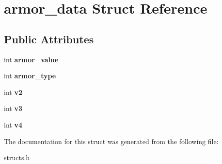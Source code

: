 \hypertarget{structarmor__data}{\section{armor\-\_\-data Struct Reference}
\label{structarmor__data}
}
\subsection*{Public Attributes}
\begin{DoxyCompactItemize}
\item 
\hypertarget{structarmor__data_a3c588b41bef925fa09984bf7ff6488e8}{int {\bfseries armor\-\_\-value}}\label{structarmor__data_a3c588b41bef925fa09984bf7ff6488e8}

\item 
\hypertarget{structarmor__data_a8199d5bf7879ab9d0fbdd84817bbc003}{int {\bfseries armor\-\_\-type}}\label{structarmor__data_a8199d5bf7879ab9d0fbdd84817bbc003}

\item 
\hypertarget{structarmor__data_ad2ca09ad88f7b998e693fc751f3f8afd}{int {\bfseries v2}}\label{structarmor__data_ad2ca09ad88f7b998e693fc751f3f8afd}

\item 
\hypertarget{structarmor__data_ad1209b7520bc204359a631758d0abb00}{int {\bfseries v3}}\label{structarmor__data_ad1209b7520bc204359a631758d0abb00}

\item 
\hypertarget{structarmor__data_a529fce0de171698bdc500a325628ec79}{int {\bfseries v4}}\label{structarmor__data_a529fce0de171698bdc500a325628ec79}

\end{DoxyCompactItemize}


The documentation for this struct was generated from the following file\-:\begin{DoxyCompactItemize}
\item 
structs.\-h\end{DoxyCompactItemize}
